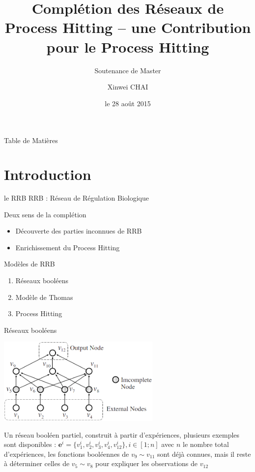 \documentclass[french]{beamer}
\title{Complétion des Réseaux de Process Hitting -- une Contribution pour le Process Hitting}
\subtitle{Soutenance de Master}
\author[X.CHAI]{Xinwei CHAI}
\date{le 28 août 2015}
\institute[ECN]{École Centrale de Nantes -- IRCCyN}
\begin{document}
\begin{frame}
	\titlepage
\end{frame}

\begin{frame}{Table de Mati\`eres}
	\tableofcontents
\end{frame}

\section{Introduction}
\begin{frame}{le RRB}
	RRB : Réseau de Régulation Biologique\vspace{0.5cm}

	Deux sens de la complétion
	\begin{itemize}
	\item Découverte des parties inconnues de RRB
	\item Enrichissement du Process Hitting
	\end{itemize}
\end{frame}
\begin{frame}{Modèles de RRB}
	\begin{enumerate}
	\item Réseaux booléens~\cite{Akutsu2009}
	\item Modèle de Thomas~\cite{Thomas1978}
	\item Process Hitting~\cite{Pauleve2014,pauleve2011modelisation,Pauleve2012}
	\end{enumerate}
\end{frame}

\begin{frame}{Réseaux booléens} 

\begin{center}
    \includegraphics[width=0.6\textwidth]{Boolean.png}
\end{center}

Un réseau booléen partiel, construit à partir d'expériences, plusieurs exemples sont disponibles : $\mathbf{e}^i=\{v_1^i,v_2^i,v_3^i,v_4^i,v_{12}^i\}, i\in[1;n]$ avec $n$ le nombre total d'expériences, les fonctions booléennes de $v_9\sim v_{11}$ sont déjà connues, mais il reste à déterminer celles de $v_5\sim v_8$ pour expliquer les observations de $v_{12}$

\end{frame}
\end{document}
